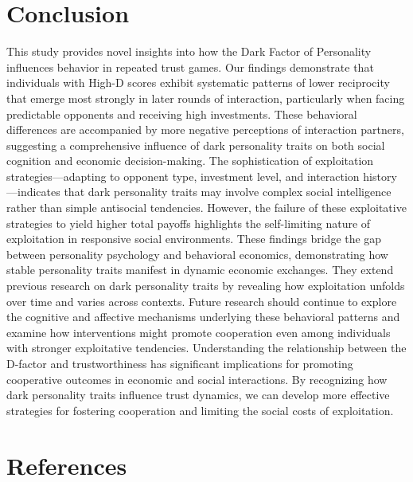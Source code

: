 \documentclass[
]{article}
\begin{document}
\section{Conclusion}\label{conclusion}

This study provides novel insights into how the Dark Factor of Personality influences behavior in repeated trust games. Our findings demonstrate that individuals with High-D scores exhibit systematic patterns of lower reciprocity that emerge most strongly in later rounds of interaction, particularly when facing predictable opponents and receiving high investments. These behavioral differences are accompanied by more negative perceptions of interaction partners, suggesting a comprehensive influence of dark personality traits on both social cognition and economic decision-making.
The sophistication of exploitation strategies---adapting to opponent type, investment level, and interaction history---indicates that dark personality traits may involve complex social intelligence rather than simple antisocial tendencies. However, the failure of these exploitative strategies to yield higher total payoffs highlights the self-limiting nature of exploitation in responsive social environments.
These findings bridge the gap between personality psychology and behavioral economics, demonstrating how stable personality traits manifest in dynamic economic exchanges. They extend previous research on dark personality traits by revealing how exploitation unfolds over time and varies across contexts. Future research should continue to explore the cognitive and affective mechanisms underlying these behavioral patterns and examine how interventions might promote cooperation even among individuals with stronger exploitative tendencies.
Understanding the relationship between the D-factor and trustworthiness has significant implications for promoting cooperative outcomes in economic and social interactions. By recognizing how dark personality traits influence trust dynamics, we can develop more effective strategies for fostering cooperation and limiting the social costs of exploitation.

\section*{References}\label{references}
\end{document}
